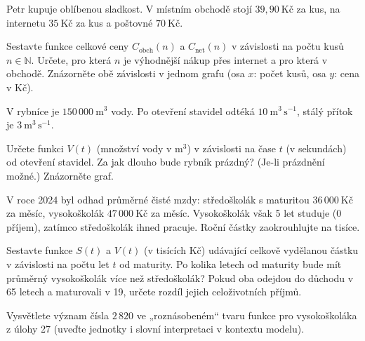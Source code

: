 \documentclass[12pt,a4paper]{article}
\begin{document}
\begin{exercise}
Petr kupuje oblíbenou sladkost. V místním obchodě stojí \(39{,}90~\mathrm{Kč}\) za kus, na internetu \(35~\mathrm{Kč}\) za kus a poštovné \(70~\mathrm{Kč}\).
\begin{tasks}
\task Sestavte funkce celkové ceny \(C_\mathrm{obch}(n)\) a \(C_\mathrm{net}(n)\) v závislosti na počtu kusů \(n\in\mathbb{N}\).
\task Určete, pro která \(n\) je výhodnější nákup přes internet a pro která v obchodě.
\task Znázorněte obě závislosti v jednom grafu (osa \(x\): počet kusů, osa \(y\): cena v Kč).
\end{tasks}
\end{exercise}

\begin{exercise}
V rybníce je \(150\,000~\mathrm{m^3}\) vody. Po otevření stavidel odtéká \(10~\mathrm{m^3\,s^{-1}}\), stálý přítok je \(3~\mathrm{m^3\,s^{-1}}\).
\begin{tasks}
\task Určete funkci \(V(t)\) (množství vody v \(\mathrm{m^3}\)) v závislosti na čase \(t\) (v sekundách) od otevření stavidel.
\task Za jak dlouho bude rybník prázdný? (Je-li prázdnění možné.) Znázorněte graf.
\end{tasks}
\end{exercise}

\begin{exercise}
V roce 2024 byl odhad průměrné čisté mzdy: středoškolák s maturitou \(36\,000~\mathrm{Kč}\) za měsíc, vysokoškolák \(47\,000~\mathrm{Kč}\) za měsíc. Vysokoškolák však 5 let studuje (0 příjem), zatímco středoškolák ihned pracuje. Roční částky zaokrouhlujte na tisíce.
\begin{tasks}
\task Sestavte funkce \(S(t)\) a \(V(t)\) (v tisících Kč) udávající celkově vydělanou částku v závislosti na počtu let \(t\) od maturity.
\task Po kolika letech od maturity bude mít průměrný vysokoškolák více než středoškolák?
\task Pokud oba odejdou do důchodu v 65 letech a maturovali v 19, určete rozdíl jejich celoživotních příjmů.
\end{tasks}
\end{exercise}

\begin{exercise}
Vysvětlete význam čísla \(2\,820\) ve „roznásobeném“ tvaru funkce pro vysokoškoláka z úlohy 27 (uveďte jednotky i slovní interpretaci v kontextu modelu).
\end{exercise}
\end{document}
